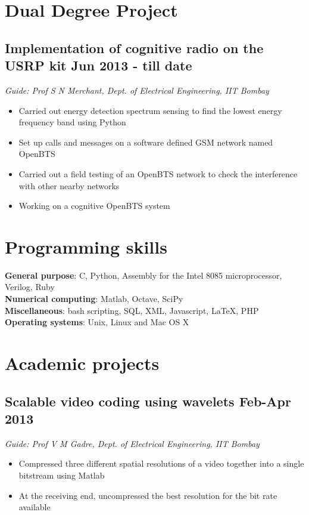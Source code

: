 \documentclass[12pt]{article}
\begin{document}
\setlength{\parindent}{0pt}
 


\vspace*{8\baselineskip}

\section*{Dual Degree Project}

\subsection*{Implementation of cognitive radio on the USRP kit \hfill  Jun 2013 - till date}
\emph{Guide: Prof S N Merchant, Dept. of Electrical Engineering, IIT Bombay} 
\begin{itemize}
\item Carried out energy detection spectrum sensing to find the lowest energy frequency band using Python
\item Set up calls and messages on a software defined GSM network named OpenBTS
\item Carried out a field testing of an OpenBTS network to check the interference with other nearby networks 
\item Working on a cognitive OpenBTS system 
\end{itemize}


\section*{Programming skills}
\textbf{General purpose}: C, Python, Assembly for the Intel 8085 microprocessor, Verilog, Ruby \\
\textbf{Numerical computing}: Matlab, Octave, SciPy \\
\textbf{Miscellaneous}: bash scripting, SQL, XML, Javascript, LaTeX, PHP \\
\textbf{Operating systems}: Unix, Linux and Mac OS X


\section*{Academic projects}
\subsection*{Scalable video coding using wavelets \hfill  Feb-Apr 2013}
\emph{Guide: Prof V M Gadre, Dept. of Electrical Engineering, IIT Bombay} 
\begin{itemize} 
\item Compressed three different spatial resolutions of a video together into a single bitstream using Matlab
\item At the receiving end, uncompressed the best resolution for the bit rate available 
\end{itemize}
\end{document}
